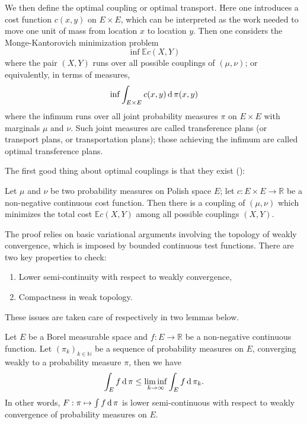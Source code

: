 We then define the optimal coupling or optimal transport.
Here one introduces a cost function \( c ( x , y ) \) on \( E \times E \),
which can be interpreted as the work needed to move one unit of mass from location \( x \) to location \( y \).
Then one considers the Monge-Kantorovich minimization problem
\[
	\inf  \mathbb{ E } c ( X , Y )
\]
where the pair \( ( X , Y ) \) runs over all possible couplings of \( ( \mu , \nu ) \);
or equivalently, in terms of measures,
\[ \inf \int _ { E \times E } c ( x , y ) \operatorname{d} \pi ( x , y ) \]
where the infimum runs over all joint probability measures \( \pi \) on \( E \times E \) with marginals \( \mu \) and \( \nu \).
Such joint measures are called transference plans (or transport plans, or transportation plans);
those achieving the infimum are called optimal transference plans.

The first good thing about optimal couplings is that they exist (\cite[Theorem 4.1]{villani2008optimal}):
\begin{thm}
	\label{thm:existence_optimal_coupling}
	Let \(  \mu \) and \(  \nu  \) be two probability measures on Polish space $E$;
	let \( c: E \times E \rightarrow \mathbb{ R }  \) be
	a non-negative continuous cost function.
	Then there is a coupling of \( ( \mu , \nu ) \) which minimizes the total cost \( \mathbb{ E } c ( X , Y ) \) among all possible couplings \( ( X , Y ) \).
\end{thm}

The proof relies on basic variational arguments involving the topology of weakly convergence,
which is imposed by bounded continuous test functions.
There are two key properties to check:
\begin{enumerate}
	\item Lower semi-continuity with respect to weakly convergence,
	\item Compactness in weak topology.
\end{enumerate}
These issues are taken care of respectively in two lemmas below.

\begin{lem}
	\label{lem:lower_semi-continuity_of_the_cost_functional}
	Let \( E \) be a Borel measurable space
	and \( f : E  \rightarrow \mathbb{ R }\) be a non-negative continuous function.
	Let \( \left( \pi _ { k } \right) _ { k \in \mathbb{ N } } \) be a sequence of
	probability measures on \( E \),
	converging weakly to a probability measure \( \pi \),
	then we have
	\[
		\int _ { E } f \operatorname{d} \pi \leq \liminf _ { k \rightarrow \infty } \int _ { E } f \operatorname{d} \pi _ { k }.
	\]
	In other words, \( F: \pi \mapsto \int f \operatorname{d} \pi \) is lower semi-continuous
	with respect to weakly convergence of probability measures on $E$.
\end{lem}

